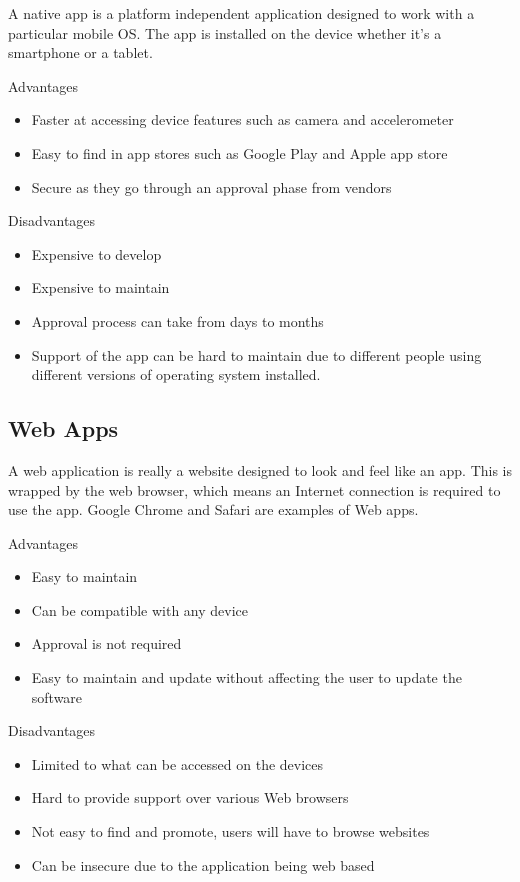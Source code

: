 A native app is a platform independent application designed to work with a particular mobile OS. The app is installed on the device whether it’s a smartphone or a tablet.

Advantages

\begin{itemize}
    \item Faster at accessing device features such as camera and accelerometer
    \item Easy to find in app stores such as Google Play and Apple app store
    \item Secure as they go through an approval phase from vendors 
\end{itemize}


Disadvantages

\begin{itemize}
    \item Expensive to develop 
    \item Expensive to maintain 
    \item Approval process can take from days to months
    \item Support of the app can be hard to maintain due to different people using different versions of operating system installed.
\end{itemize}

\subsection{Web Apps}

A web application is really a website designed to look and feel like an app. This is wrapped by the web browser, which means an Internet connection is required to use the app. Google Chrome and Safari are examples of Web apps. 

Advantages

\begin{itemize}
    \item Easy to maintain 
    \item Can be compatible with any device 
    \item Approval is not required
    \item Easy to maintain and update without affecting the user to update the software 
\end{itemize}

Disadvantages
\begin{itemize}
    \item Limited to what can be accessed on the devices 
    \item Hard to provide support over various Web browsers
    \item Not easy to find and promote, users will have to browse websites 
    \item Can be insecure due to the application being web based 
\end{itemize}

